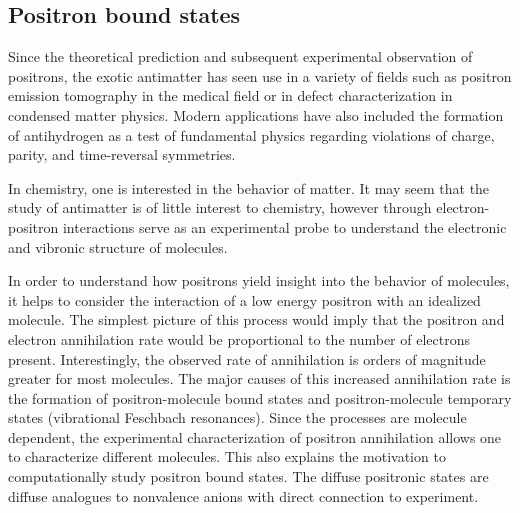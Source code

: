 \subsection{Positron bound states}
Since the theoretical prediction\cite{10.1098/rspa.1928.0023} and subsequent experimental observation\cite{10.1126/science.76.1967.238} of positrons, the exotic antimatter has seen use in a variety of fields such as positron emission tomography in the medical field or in defect characterization in condensed matter physics.\cite{10.1088/0031-9155/51/13/R08,10.1146/annurev-bioeng-071114-040723,10.1146/annurev.ms.10.080180.002141,10.1016/j.matchar.2021.110952}
Modern applications have also included the formation of antihydrogen as a test of fundamental physics regarding violations of charge, parity, and time-reversal symmetries.\cite{10.1126/science.aaf6702,10.1038/nature24048,10.1103/PhysRevLett.110.140406,10.1038/nature14861,10.1103/PhysRevLett.82.3198}

In chemistry, one is interested in the behavior of matter.
It may seem that the study of antimatter is of little interest to chemistry, however through electron-positron interactions serve as an experimental probe to understand the electronic and vibronic structure of molecules.

In order to understand how positrons yield insight into the behavior of molecules, it helps to consider the interaction of a low energy positron with an idealized molecule.
The simplest picture of this process would imply that the positron and electron annihilation rate would be proportional to the number of electrons present.\cite{10.1103/RevModPhys.82.2557}
Interestingly, the observed rate of annihilation is orders of magnitude greater for most molecules.\cite{10.1103/RevModPhys.82.2557, 10.1103/PhysRev.140.A8, 10.1103/PhysRev.138.B216, 10.1088/0953-4075/39/17/L03, 10.1103/PhysRevLett.14.935, 10.1103/PhysRevA.77.060702, 10.1103/PhysRevLett.99.133201}
The major causes of this increased annihilation rate is the formation of positron-molecule bound states and positron-molecule temporary states (vibrational Feschbach resonances).\cite{10.1103/RevModPhys.82.2557, 10.1103/PhysRevLett.99.133201, 10.1103/PhysRevLett.88.043201,10.1103/PhysRevA.67.032706}
Since the processes are molecule dependent, the experimental characterization of positron annihilation allows one to characterize different molecules.
This also explains the motivation to computationally study positron bound states.
The diffuse positronic states are diffuse analogues to nonvalence anions with direct connection to experiment.

